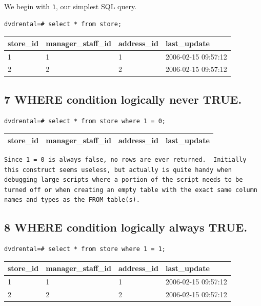 \documentclass[]{book}
\theoremstyle{definition}
\theoremstyle{definition}
\theoremstyle{definition}
\theoremstyle{remark}
\begin{document}
We begin with \texttt{1}, our simplest SQL query.

\begin{verbatim}
dvdrental=# select * from store;  
\end{verbatim}

\begin{longtable}[]{@{}llll@{}}
\toprule
store\_id & manager\_staff\_id & address\_id &
last\_update\tabularnewline
\midrule
\endhead
1 & 1 & 1 & 2006-02-15 09:57:12\tabularnewline
2 & 2 & 2 & 2006-02-15 09:57:12\tabularnewline
\bottomrule
\end{longtable}

\hypertarget{where-condition-logically-never-true.}{%
\subsection{7 WHERE condition logically never
TRUE.}\label{where-condition-logically-never-true.}}

\begin{verbatim}
dvdrental=# select * from store where 1 = 0;
\end{verbatim}

\begin{longtable}[]{@{}llll@{}}
\toprule
store\_id & manager\_staff\_id & address\_id &
last\_update\tabularnewline
\midrule
\endhead
\bottomrule
\end{longtable}

\begin{verbatim}
Since 1 = 0 is always false, no rows are ever returned.  Initially this construct seems useless, but actually is quite handy when debugging large scripts where a portion of the script needs to be turned off or when creating an empty table with the exact same column names and types as the FROM table(s).  
\end{verbatim}

\hypertarget{where-condition-logically-always-true.}{%
\subsection{8 WHERE condition logically always
TRUE.}\label{where-condition-logically-always-true.}}

\begin{verbatim}
dvdrental=# select * from store where 1 = 1;
\end{verbatim}

\begin{longtable}[]{@{}llll@{}}
\toprule
store\_id & manager\_staff\_id & address\_id &
last\_update\tabularnewline
\midrule
\endhead
1 & 1 & 1 & 2006-02-15 09:57:12\tabularnewline
2 & 2 & 2 & 2006-02-15 09:57:12\tabularnewline
\bottomrule
\end{longtable}
\end{document}

